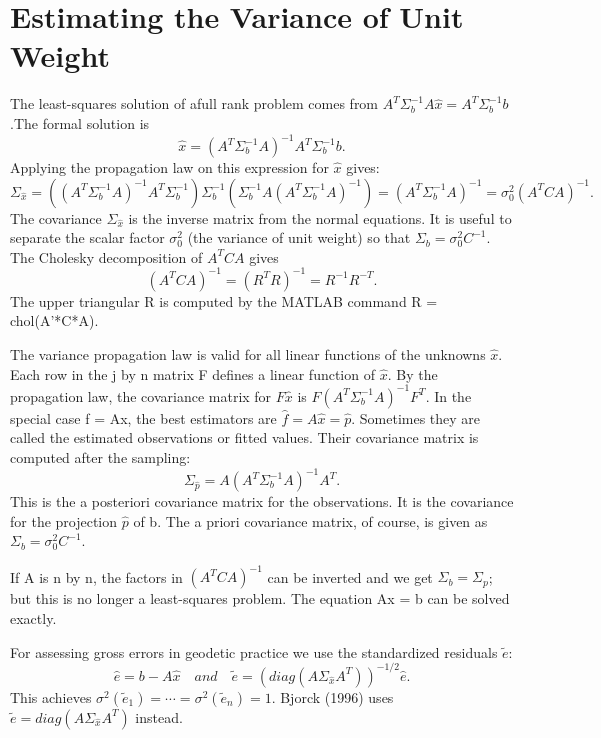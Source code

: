 \section{Estimating the Variance of Unit Weight}
The least-squares solution of afull rank problem comes from $A^T\Sigma^{-1}_bA\hat{x}=A^T\Sigma^{-1}_bb$.The formal solution is
\begin{equation*}
\hat{x}=(A^T\Sigma^{-1}_bA)^{-1}A^T\Sigma^{-1}_bb.
\end{equation*}
Applying the propagation law on this expression for $\hat{x}$ gives:
\begin{equation}
\Sigma_{\hat{x}}=((A^T\Sigma^{-1}_bA)^{-1}A^T\Sigma^{-1}_b)\Sigma^{-1}_b(\Sigma^{-1}_bA(A^T\Sigma^{-1}_bA)^{-1})=(A^T\Sigma^{-1}_bA)^{-1}=\sigma^2_0(A^TCA)^{-1}.
\end{equation}
The covariance $\Sigma_{\hat{x}}$ is the inverse matrix from the normal equations. It is useful to separate the scalar factor $\sigma^2_0$ (the variance of unit weight) so that $\Sigma_b=\sigma^2_0C^{-1}$. The Cholesky decomposition of $A^TCA$ gives
\begin{equation}
(A^TCA)^{-1}=(R^TR)^{-1}=R^{-1}R^{-T}.
\end{equation}
The upper triangular R is computed by the MATLAB command R = chol(A'*C*A).

The variance propagation law is valid for all linear functions of the unknowns $\hat{x}$.
Each row in the j by n matrix F defines a linear function of $\hat{x}$. By the propagation law,
the covariance matrix for $F\hat{x}$ is $F(A^T\Sigma^{-1}_bA)^{-1}F^T$. In the special case f = Ax, the best estimators are $\hat{f}=A\hat{x}=\hat{p}$. Sometimes they are called the estimated observations or fitted values. Their covariance matrix is computed after the sampling:
\begin{equation}
\Sigma_{\hat{p}}=A(A^T\Sigma^{-1}_bA)^{-1}A^T.
\end{equation}
This is the a posteriori covariance matrix for the observations. It is the covariance for the
projection $\hat{p}$ of b. The a priori covariance matrix, of course, is given as $\Sigma_b=\sigma^2_0C^{-1}$.

If A is n by n, the factors in $(A^TCA)^{-1}$ can be inverted and we get $\Sigma_b= \Sigma_p$; but
this is no longer a least-squares problem. The equation Ax = b can be solved exactly.

For assessing gross errors in geodetic practice we use the standardized residuals $\tilde{e}$:
\begin{equation}
\hat{e}=b-A\hat{x} \quad and \quad
\tilde{e}=(diag(A\Sigma_{\hat{x}}A^T))^{-1/2}\hat{e}.
\end{equation} 
This achieves $\sigma^2(\tilde{e}_1)=\cdots=\sigma^2(\tilde{e}_n)=1$. Bjorck (1996) uses $\tilde{e}=diag(A\Sigma_{\hat{x}}A^T)$ instead.

